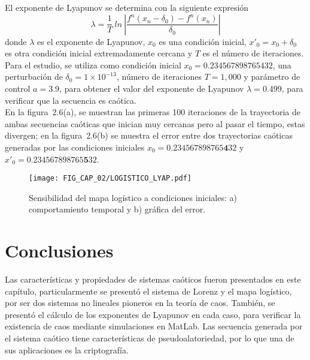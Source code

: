 El exponente de Lyapunov se determina con la siguiente expresión 
\begin{equation}
\lambda=\dfrac{1}{T}~ln~|\dfrac{f^{n}(x_{n}-\delta_{0})-f^{n}(x_{n})}{\delta_{0}}|
\end{equation}
donde $\lambda$ es el exponente de Lyapunov, $x_{0}$ es una condición inicial, $x'_{0}=x_{0}+\delta_{0}$ es otra condición inicial extremadamente cercana y $T$ es el número de iteraciones. \\

Para el estudio, se utiliza como condición inicial $x_{0}=0.234567898765432$, una perturbación de $\delta_{0}=1 \times10^{-13}$, número de iteraciones $T=1,000$ y parámetro de control $a=3.9$, para obtener el valor del exponente de Lyapunov $\lambda=0.499$, para verificar que la secuencia es caótica. \\

En la figura~2.6(a), se muestran las primeras 100 iteraciones de la trayectoria de ambas secuencias caóticas que inician muy cercanas pero al pasar el tiempo, estas divergen; en la figura~2.6(b) se muestra el error entre dos trayectorias caóticas generadas por las condiciones iniciales $x_{0}=0.234567898765\textbf{4}32$ y $x'_{0}=0.234567898765\textbf{5}32$.

\begin{figure}[!htbp] %
	\center
	 \texttt{[image: FIG\_CAP\_02/LOGISTICO\_LYAP.pdf]} 
	\caption{Sensibilidad del mapa logístico a condiciones iniciales: a) comportamiento temporal y b) gráfica del error.}
\end{figure}

\section{Conclusiones}
Las características y propiedades de sistemas caóticos fueron presentados en este capítulo, particularmente se presentó el sistema de Lorenz y el mapa logístico, por ser dos sistemas no lineales pioneros en la teoría de caos. También, se presentó el cálculo de los exponentes de Lyapunov en cada caso, para verificar la existencia de caos mediante simulaciones en MatLab. Las secuencia generada por el sistema caótico tiene características de pseudoalatoriedad, por lo que una de sus aplicaciones es la criptografía.  